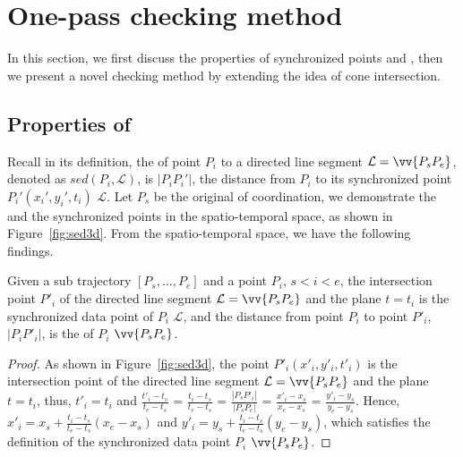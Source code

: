 \section{One-pass \sed checking method}

In this section, we first discuss the properties of synchronized points and \sed, then we present a novel \sed checking method by extending the idea of cone intersection.



\subsection{Properties of \sed} %
Recall in its definition, the \sed of point $P_i$ to a directed line segment $\mathcal{L} = \vv{P_{s}P_{e}}$, denoted as $sed(P_i, \mathcal{L})$, is $|P_iP_i'|$, the distance from $P_i$ to its synchronized point $P_i' (x_i', y_i', t_i)$ \wrt $\mathcal{L}$.
Let $P_s$ be the original of coordination, we demonstrate the \sed and the synchronized points in the spatio-temporal space, as shown in Figure~\ref{fig:sed3d}.
From the spatio-temporal space, we have the following findings.



\begin{lemma}
\label{prop-3d-syn-point}
Given a sub trajectory $[P_s, \ldots, P_e]$ and a point $P_i$, $s<i<e$, the intersection point $P'_i$ of the directed line segment $\mathcal{L} = \vv{P_sP_e}$ and the plane $t=t_i$ is the synchronized data point of $P_i$ \wrt $\mathcal{L}$,
and the distance from point $P_i$ to point $P'_i$, $|P_iP'_i|$, is the \sed of $P_i$ \wrt $\vv{P_sP_e}$.
\end{lemma}

\begin{proof}
As shown in Figure~\ref{fig:sed3d}, the point $P'_i (x'_i, y'_i, t'_i)$ is the intersection point of the directed line segment $\mathcal{L} = \vv{P_sP_e}$ and the plane $t=t_i$, thus, $t'_i = t_i$ and $\frac{t'_i - t_s}{t_e - t_s}$ = $\frac{t_i - t_s}{t_e - t_s}$  = $\frac{|P_sP'_i|}{|P_sP_e|}$ = $\frac{x'_i - x_s}{x_e - x_s}$ = $\frac{y'_i - y_s}{y_e - y_s}$. Hence, $x'_i = x_s +  \frac{t_i-t_s}{t_e - t_s}(x_e - x_s)$ and $y'_i = y_s +  \frac{t_i - t_s}{t_e - t_s}(y_e - y_s)$, which satisfies the definition of the synchronized data point $P_i$ \wrt $\vv{P_sP_e}$.
\end{proof}



